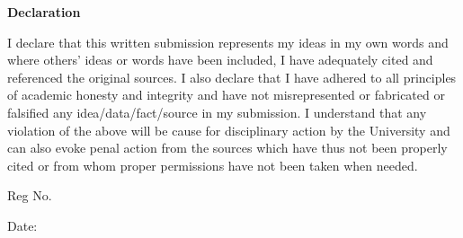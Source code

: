 \graphicspath{{Figures/PNG/}{Figures/}}
\vspace{-4.5\baselineskip}

\begin{center}
{\bf\large Declaration }\\
\par\vspace{5mm}
\end{center}
\noindent I declare that this written submission represents my ideas in my own
words and where others'
ideas or words have been included, I have adequately cited and referenced the
original sources. I also
declare that I have adhered to all principles of academic honesty and integrity
and have not
misrepresented or fabricated or falsified any idea/data/fact/source in my
submission. I understand that
any violation of the above will be cause for disciplinary action by the University
and can also evoke
penal action from the sources which have thus not been properly cited or from
whom proper
permissions have not been taken when needed.
\vspace{20mm}
\vspace{10mm}
\begin{flushright}
\thescholar\end{flushright}\vspace{10mm}
\begin{flushright}

Reg No. \theregnumber
\end{flushright}
\vspace{30mm}
\begin{flushleft}

Date:
\end{flushleft}
